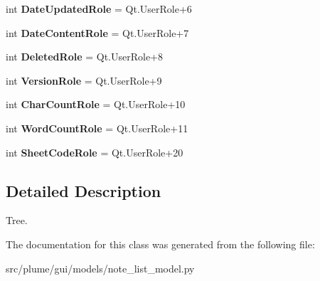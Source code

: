 \begin{DoxyCompactItemize}
\item 
int {\bfseries Date\+Updated\+Role} = Qt.\+User\+Role+6\hypertarget{classplume-creator_1_1src_1_1plume_1_1gui_1_1models_1_1note__list__model_1_1_note_list_model_a3606568c94347677172de145459fdf3a}{}\label{classplume-creator_1_1src_1_1plume_1_1gui_1_1models_1_1note__list__model_1_1_note_list_model_a3606568c94347677172de145459fdf3a}

\item 
int {\bfseries Date\+Content\+Role} = Qt.\+User\+Role+7\hypertarget{classplume-creator_1_1src_1_1plume_1_1gui_1_1models_1_1note__list__model_1_1_note_list_model_a84ea265d21d4f21db95f4e085cc43b79}{}\label{classplume-creator_1_1src_1_1plume_1_1gui_1_1models_1_1note__list__model_1_1_note_list_model_a84ea265d21d4f21db95f4e085cc43b79}

\item 
int {\bfseries Deleted\+Role} = Qt.\+User\+Role+8\hypertarget{classplume-creator_1_1src_1_1plume_1_1gui_1_1models_1_1note__list__model_1_1_note_list_model_a15e4d4ec3269e8df0f52789062efc120}{}\label{classplume-creator_1_1src_1_1plume_1_1gui_1_1models_1_1note__list__model_1_1_note_list_model_a15e4d4ec3269e8df0f52789062efc120}

\item 
int {\bfseries Version\+Role} = Qt.\+User\+Role+9\hypertarget{classplume-creator_1_1src_1_1plume_1_1gui_1_1models_1_1note__list__model_1_1_note_list_model_a908f90971412be1c8dad3bf2cd6bd668}{}\label{classplume-creator_1_1src_1_1plume_1_1gui_1_1models_1_1note__list__model_1_1_note_list_model_a908f90971412be1c8dad3bf2cd6bd668}

\item 
int {\bfseries Char\+Count\+Role} = Qt.\+User\+Role+10\hypertarget{classplume-creator_1_1src_1_1plume_1_1gui_1_1models_1_1note__list__model_1_1_note_list_model_aeb7fdf42c8052d32f29fb42426e5f1ce}{}\label{classplume-creator_1_1src_1_1plume_1_1gui_1_1models_1_1note__list__model_1_1_note_list_model_aeb7fdf42c8052d32f29fb42426e5f1ce}

\item 
int {\bfseries Word\+Count\+Role} = Qt.\+User\+Role+11\hypertarget{classplume-creator_1_1src_1_1plume_1_1gui_1_1models_1_1note__list__model_1_1_note_list_model_a7933bc3802edcfa6c2772c986ca4fe05}{}\label{classplume-creator_1_1src_1_1plume_1_1gui_1_1models_1_1note__list__model_1_1_note_list_model_a7933bc3802edcfa6c2772c986ca4fe05}

\item 
int {\bfseries Sheet\+Code\+Role} = Qt.\+User\+Role+20\hypertarget{classplume-creator_1_1src_1_1plume_1_1gui_1_1models_1_1note__list__model_1_1_note_list_model_a2483ff35fcaf3af358ec6f95596b2539}{}\label{classplume-creator_1_1src_1_1plume_1_1gui_1_1models_1_1note__list__model_1_1_note_list_model_a2483ff35fcaf3af358ec6f95596b2539}

\end{DoxyCompactItemize}


\subsection{Detailed Description}
Tree. 

The documentation for this class was generated from the following file\+:\begin{DoxyCompactItemize}
\item 
src/plume/gui/models/note\+\_\+list\+\_\+model.\+py\end{DoxyCompactItemize}
